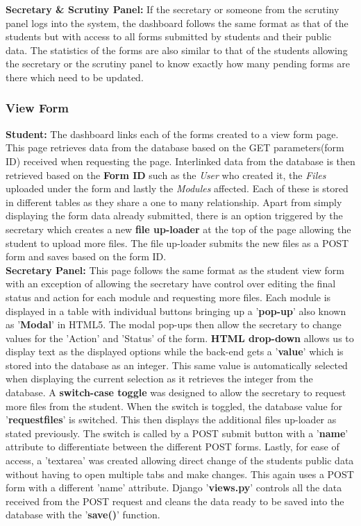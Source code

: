 \documentclass[../main.tex]{subfiles}
\begin{document}
\textbf{Secretary \& Scrutiny Panel:} If the secretary or someone from the scrutiny panel logs into the system, the dashboard follows the same format as that of the students but with access to all forms submitted by students and their public data. The statistics of the forms are also similar to that of the students allowing the secretary or the scrutiny panel to know exactly how many pending forms are there which need to be updated. 

\subsubsection{View Form} 

\textbf{Student:} The dashboard links each of the forms created to a view form page. This page retrieves data from the database based on the GET parameters(form ID) received when requesting the page. Interlinked data from the database is then retrieved based on the \textbf{Form ID} such as the \textit{User} who created it, the \textit{Files} uploaded under the form and lastly the \textit{Modules} affected. Each of these is stored in different tables as they share a one to many relationship. Apart from simply displaying the form data already submitted, there is an option triggered by the secretary which creates a new \textbf{file up-loader} at the top of the page allowing the student to upload more files. The file up-loader submits the new files as a POST form and saves based on the form ID. \\[4mm]

\textbf{Secretary Panel:} This page follows the same format as the student view form with an exception of allowing the secretary have control over editing the final status and action for each module and requesting more files. Each module is displayed in a table with individual buttons bringing up a '\textbf{pop-up}' also known as '\textbf{Modal}' in HTML5. The modal pop-ups then allow the secretary to change values for the 'Action' and 'Status' of the form. \textbf{HTML drop-down} allows us to display text as the displayed options while the back-end gets a '\textbf{value}' which is stored into the database as an integer. This same value is automatically selected when displaying the current selection as it retrieves the integer from the database. A \textbf{switch-case toggle} was designed to allow the secretary to request more files from the student. When the switch is toggled, the database value for '\textbf{requestfiles}' is switched. This then displays the additional files up-loader as stated previously. The switch is called by a POST submit button with a '\textbf{name}' attribute to differentiate between the different POST forms. Lastly, for ease of access, a 'textarea' was created allowing direct change of the students public data without having to open multiple tabs and make changes. This again uses a POST form with a different 'name' attribute. Django '\textbf{views.py}' controls all the data received from the POST request and cleans the data ready to be saved into the database with the '\textbf{save()}' function. \\[4mm]
\end{document}
